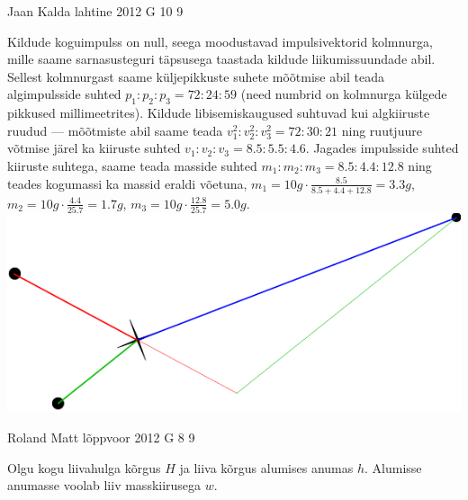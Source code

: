 \documentclass[11pt, twoside]{article}
\begin{document}
{%
{Jaan Kalda} %
{lahtine} %
{2012} %
{G 10} %
{9} %
{

\ifSolution
Kildude koguimpulss on null, seega moodustavad impulsivektorid kolmnurga, mille saame sarnasusteguri täpsusega taastada kildude liikumissuundade abil.
Sellest kolmnurgast saame küljepikkuste suhete mõõtmise abil  teada algimpulsside suhted $p_1 : p_2: p_3 = \num{72} : \num{24} : \num{59}$ (need numbrid on 
kolmnurga külgede pikkused millimeetrites). 
Kildude libisemiskaugused suhtuvad kui algkiiruste ruudud --- mõõtmiste abil saame teada $v_1^2:v_2^2:v_3^2 = \num{72}:\num{30}:\num{21}$ ning ruutjuure võtmise järel ka 
kiiruste suhted $v_1 : v_2: v_3 = \num{8,5}:\num{5,5}:\num{4,6}$. Jagades impulsside suhted kiiruste suhtega, saame teada masside suhted $m_1:m_2:m_3=\num{8,5}:\num{4,4}:\num{12,8}$ 
ning teades kogumassi ka massid eraldi võetuna, $m_1=\SI {10}g\cdot \frac{\num{8,5}}{\num{8,5}+\num{4,4}+\num{12,8}} = \SI{3,3}g$, $m_2=\SI {10}g\cdot \frac{\num{4,4}}{\num{25,7}}=\SI{1,7}g$, 
$m_3=\SI {10}g\cdot \frac{\num{12,8}}{\num{25,7}}=\SI{5,0}g$.\\
\hspace*{0\columnwidth}\includegraphics[width=\columnwidth]{2012-lahg-10-killud_lah}
\fi
}

{Roland Matt} %
{lõppvoor} %
{2012} %
{G 8} %
{9} %
{

\ifSolution
Olgu kogu liivahulga kõrgus $H$ ja liiva kõrgus alumises anumas $h$. Alumisse anumasse voolab liiv masskiirusega $w$. 


}}
\end{document}
